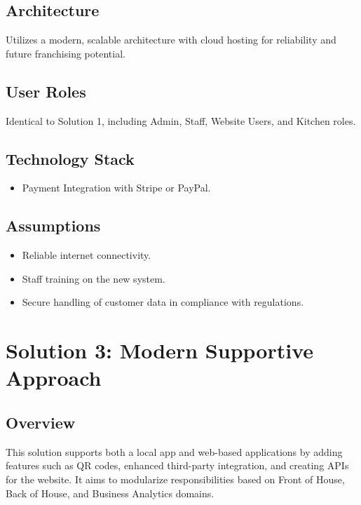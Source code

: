 \documentclass{article}
\begin{document}
\subsection*{Architecture}
Utilizes a modern, scalable architecture with cloud hosting for reliability and future franchising potential.

\subsection*{User Roles}
Identical to Solution 1, including Admin, Staff, Website Users, and Kitchen roles.

\subsection*{Technology Stack}
\begin{itemize}
    \item Payment Integration with Stripe or PayPal.
\end{itemize}

\subsection*{Assumptions}
\begin{itemize}
    \item Reliable internet connectivity.
    \item Staff training on the new system.
    \item Secure handling of customer data in compliance with regulations.
\end{itemize}

\section*{Solution 3: Modern Supportive Approach}

\subsection*{Overview}
This solution supports both a local app and web-based applications by adding features such as QR codes, enhanced third-party integration, and creating APIs for the website. It aims to modularize responsibilities based on Front of House, Back of House, and Business Analytics domains.
\end{document}
